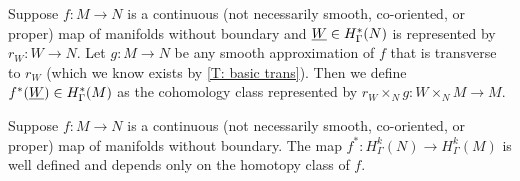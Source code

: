 \begin{definition}
Suppose $f \colon M \to N$ is a continuous (not necessarily smooth, co-oriented, or proper) map of manifolds without boundary and $\underline{W} \in H^*_\Gamma(N)$ is represented by $r_W \colon W \to N$. Let $g \colon M \to N$ be any smooth approximation of $f$ that is transverse to $r_W$ (which we know exists by \cref{T: basic trans}). Then we define $f^*(\underline{W}) \in H^*_\Gamma(M)$ as the cohomology class represented by $r_W\times_N g:W\times_N M \to M$.
\end{definition}


\begin{proposition}\label{P: cohomology pullback}
Suppose $f \colon M \to N$ is a continuous (not necessarily smooth, co-oriented, or proper) map of manifolds without boundary. The map $f^*:H^k_\Gamma(N) \to H^k_\Gamma(M)$ is well defined and depends only on the homotopy class of $f$.
\end{proposition}
